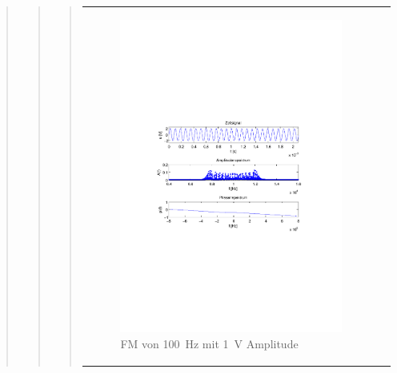 \begin{quote}
\begin{quote}
\begin{quote}
\begin{center}
\begin{tabular}{ll}
                \begin{minipage}{0.6\textwidth}
                    \begin{figure}[H]
                        \label{fig:f100_1}
                        \includegraphics[scale=0.7, trim = 35mm 100mm 35mm 95mm, clip]{Bilder/f100_1}
                        \caption{FM von \SI{100}{\hertz} mit \SI{1}{\volt} Amplitude}
                    \end{figure}
                \end{minipage}
            
            \end{tabular}
            \end{center}
            

\end{quote}
\end{quote}
\end{quote}
